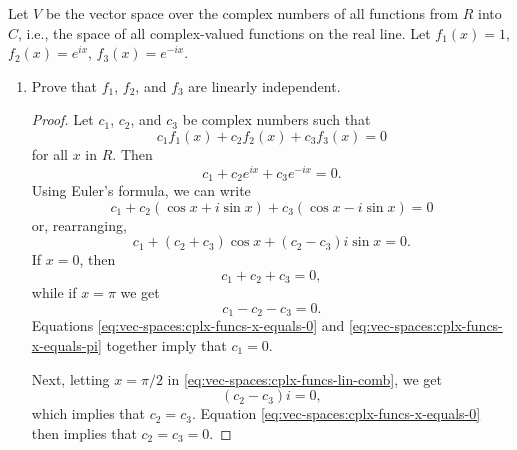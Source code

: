  Let $V$ be the vector space over the complex numbers of all
functions from $R$ into $C$, i.e., the space of all complex-valued
functions on the real line. Let $f_1(x) = 1$, $f_2(x) = e^{ix}$,
$f_3(x) = e^{-ix}$.
\begin{enumerate}
\item Prove that $f_1$, $f_2$, and $f_3$ are linearly independent.
  \begin{proof}
    Let $c_1$, $c_2$, and $c_3$ be complex numbers such that
    \begin{equation*}
      c_1f_1(x) + c_2f_2(x) + c_3f_3(x) = 0
    \end{equation*}
    for all $x$ in $R$. Then
    \begin{equation*}
      c_1 + c_2e^{ix} + c_3e^{-ix} = 0.
    \end{equation*}
    Using Euler's formula, we can write
    \begin{equation*}
      c_1 + c_2(\cos x + i\sin x) + c_3(\cos x - i\sin x) = 0
    \end{equation*}
    or, rearranging,
    \begin{equation}
      \label{eq:vec-spaces:cplx-funcs-lin-comb}
      c_1 + (c_2 + c_3)\cos x + (c_2 - c_3)i\sin x = 0.
    \end{equation}
    If $x = 0$, then
    \begin{equation}
      \label{eq:vec-spaces:cplx-funcs-x-equals-0}
      c_1 + c_2 + c_3 = 0,
    \end{equation}
    while if $x = \pi$ we get
    \begin{equation}
      \label{eq:vec-spaces:cplx-funcs-x-equals-pi}
      c_1 - c_2 - c_3 = 0.
    \end{equation}
    Equations \eqref{eq:vec-spaces:cplx-funcs-x-equals-0} and
    \eqref{eq:vec-spaces:cplx-funcs-x-equals-pi} together imply that
    $c_1 = 0$.

    Next, letting $x = \pi/2$ in
    \eqref{eq:vec-spaces:cplx-funcs-lin-comb}, we get
    \begin{equation}
      \label{eq:vec-spaces:cplx-funcs-x-equals-pi-2}
      (c_2 - c_3)i = 0,
    \end{equation}
    which implies that $c_2 = c_3$. Equation
    \eqref{eq:vec-spaces:cplx-funcs-x-equals-0} then implies that
    $c_2 = c_3 = 0$.


\end{proof}
\end{enumerate}

